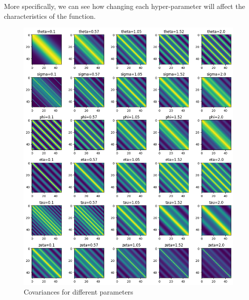 \documentclass[12pt]{article}
\begin{document}
\newpage
More specifically, we can see how changing each hyper-parameter will affect the characteristics of the function.

\begin{figure}[h]
\centering
\begin{minipage}{.5\textwidth}
  \centering
\includegraphics[scale = 0.35]{outputs/q2/c-parameter-grams}
\caption{Covariances for different parameters}
\label{fig:fig2-c-parameter-grams}
\end{minipage}%
\begin{minipage}{.5\textwidth}
  \centering

\end{minipage}
\end{figure}
\end{document}
